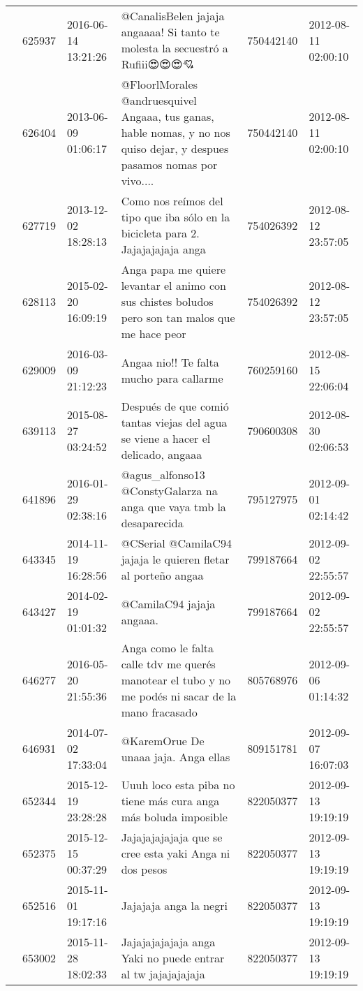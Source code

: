 \begin{tabular}{llllrl}
 & 625937& 2016-06-14 13:21:26 &@CanalisBelen jajaja angaaaa! Si tanto te molesta la secuestró a Rufiii😍😍😍💘 & 750442140 & 2012-08-11 02:00:10 \\
 & 626404& 2013-06-09 01:06:17 & @FloorlMorales @andruesquivel Angaaa, tus ganas, hable nomas, y no nos quiso dejar, y despues pasamos nomas por vivo.... & 750442140 & 2012-08-11 02:00:10 \\
 & 627719& 2013-12-02 18:28:13 &Como nos reímos del tipo que iba sólo en la bicicleta para 2. Jajajajajaja anga & 754026392 & 2012-08-12 23:57:05 \\
 & 628113& 2015-02-20 16:09:19 &Anga papa me quiere levantar el animo con sus chistes boludos pero son tan malos que me hace peor & 754026392 & 2012-08-12 23:57:05 \\
 & 629009& 2016-03-09 21:12:23 & Angaa nio!! Te falta mucho para callarme 👊 & 760259160 & 2012-08-15 22:06:04 \\
 & 639113& 2015-08-27 03:24:52 & Después de que comió tantas viejas del agua se viene a hacer el delicado, angaaa & 790600308 & 2012-08-30 02:06:53 \\
 & 641896& 2016-01-29 02:38:16 &@agus\_alfonso13 @ConstyGalarza na anga que vaya tmb la desaparecida & 795127975 & 2012-09-01 02:14:42 \\
 & 643345& 2014-11-19 16:28:56 &@CSerial @CamilaC94 jajaja le quieren fletar al porteño angaa & 799187664 & 2012-09-02 22:55:57 \\
 & 643427& 2014-02-19 01:01:32 &@CamilaC94 jajaja angaaa. & 799187664 & 2012-09-02 22:55:57 \\
 & 646277& 2016-05-20 21:55:36 &Anga como le falta calle tdv me querés manotear el tubo y no me podés ni sacar de la mano fracasado & 805768976 & 2012-09-06 01:14:32 \\
 & 646931& 2014-07-02 17:33:04 & @KaremOrue De unaaa jaja. Anga ellas & 809151781 & 2012-09-07 16:07:03 \\
 & 652344& 2015-12-19 23:28:28 &Uuuh loco esta piba no tiene más cura anga más boluda imposible & 822050377 & 2012-09-13 19:19:19 \\
 & 652375& 2015-12-15 00:37:29 & Jajajajajajaja que se cree esta yaki Anga ni dos pesos & 822050377 & 2012-09-13 19:19:19 \\
 & 652516& 2015-11-01 19:17:16 & Jajajaja anga la negri 💁 & 822050377 & 2012-09-13 19:19:19 \\
 & 653002& 2015-11-28 18:02:33 &Jajajajajajaja anga Yaki no puede entrar al tw jajajajajaja & 822050377 & 2012-09-13 19:19:19 \\

\end{tabular}
